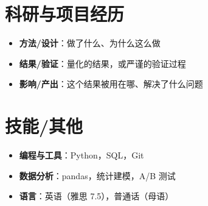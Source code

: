 \documentclass{my-resume}
\begin{document}
\section{科研与项目经历}
\begin{itemize}[parsep=0.2ex]
  \item \textbf{方法/设计}：做了什么、为什么这么做
  \item \textbf{结果/验证}：量化的结果，或严谨的验证过程
  \item \textbf{影响/产出}：这个结果被用在哪、解决了什么问题
\end{itemize}

\section{技能/其他}
\entrySkillsSep
\begin{itemize}[parsep=0.2ex]
  \item \textbf{编程与工具}：Python，SQL，Git
  \item \textbf{数据分析}：pandas，统计建模，A/B 测试
  \item \textbf{语言}：英语（雅思 7.5），普通话（母语）
\end{itemize}
\end{document}
